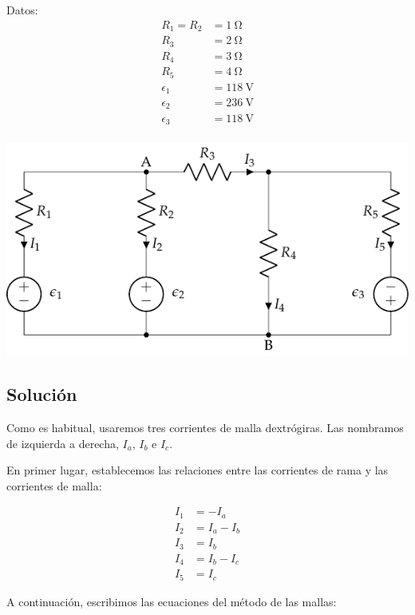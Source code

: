 \documentclass[10pt]{article}
\begin{document}
\begin{minipage}{0.4\linewidth}
  Datos:
  \begin{align*}
    R_1 = R_2 &= \SI{1}{\ohm}\\
    R_3 &= \SI{2}{\ohm}\\
    R_4 &= \SI{3}{\ohm}\\
    R_5 &= \SI{4}{\ohm}\\
    \epsilon_1 &= \SI{118}{\volt}\\
    \epsilon_2 &= \SI{236}{\volt}\\
    \epsilon_3 &= \SI{118}{\volt}\\
  \end{align*}
\end{minipage}
\begin{minipage}{0.6\linewidth}
  \includegraphics{../figs/mallas2.pdf}
\end{minipage}

\subsection*{Solución}

Como es habitual, usaremos tres corrientes de malla dextrógiras. Las nombramos de izquierda a derecha, $I_a$, $I_b$ e $I_c$.

En primer lugar, establecemos las relaciones entre las corrientes de rama y las corrientes de malla:

\begin{align*}
  I_1 &= -I_a\\
  I_2 &= I_a - I_b\\
  I_3 &= I_b\\
  I_4 &= I_b - I_c\\
  I_5 &= I_c
\end{align*}

A continuación, escribimos las ecuaciones del método de las mallas:
\end{document}
